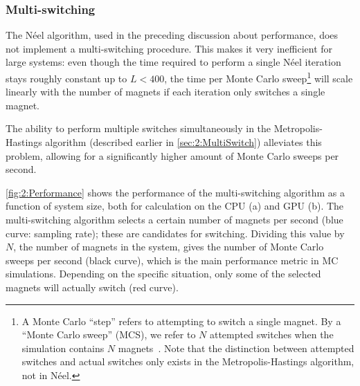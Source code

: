 \subsubsection{Multi-switching}
The N\'eel algorithm, used in the preceding discussion about performance, does not implement a multi-switching procedure.
This makes it very inefficient for large systems: even though the time required to perform a single N\'eel iteration stays roughly constant up to $L<400$, the time per Monte Carlo sweep\footnote{
	A Monte Carlo ``step'' refers to attempting to switch a single magnet. By a ``Monte Carlo sweep'' (MCS), we refer to $N$ attempted switches when the simulation contains $N$ magnets~\cite{NumericalDynamicalNiedermayer}. Note that the distinction between attempted switches and actual switches only exists in the Metropolis-Hastings algorithm, not in N\'eel. %
} will scale linearly with the number of magnets if each iteration only switches a single magnet. \par
The ability to perform multiple switches simultaneously in the Metropolis-Hastings algorithm (described earlier in \cref{sec:2:MultiSwitch}) alleviates this problem, allowing for a significantly higher amount of Monte Carlo sweeps per second. \\\par
\cref{fig:2:Performance} shows the performance of the multi-switching algorithm as a function of system size, both for calculation on the CPU (a) and GPU (b).
The multi-switching algorithm selects a certain number of magnets per second (blue curve: sampling rate); these are candidates for switching.
Dividing this value by $N$, the number of magnets in the system, gives the number of Monte Carlo sweeps per second (black curve), which is the main performance metric in MC simulations.
Depending on the specific situation, only some of the selected magnets will actually switch (red curve).


